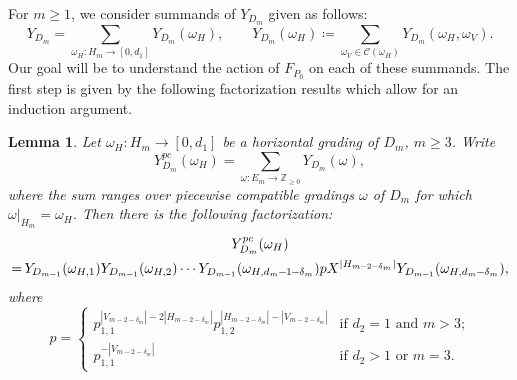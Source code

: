 \documentclass[10pt]{amsart}
\newtheorem{lemma}[theorem]{Lemma}
\theoremstyle{definition}
\newcommand{\cC}{\mathcal{C}}
\newcommand{\ZZ}{\mathbb{Z}}
\newcommand*{\mk}{\mkern -1mu}
\newcommand*{\Mk}{\mkern -2mu}
\begin{document}
For $m\ge1$, we consider summands of $Y_{D_m}$ given as follows:
\begin{equation}
 \label{eq:Y decomposition}
 Y_{D_m}=\sum_{\omega_H:H_m\to[0,d_1]}Y_{D_m}(\omega_H),\qquad Y_{D_m}(\omega_H)\coloneqq \sum_{\omega_V\in\cC(\omega_H)}Y_{D_m}(\omega_H,\omega_V).
\end{equation}
Our goal will be to understand the action of $F_{P_0}$ on each of these summands.
The first step is given by the following factorization results which allow for an induction argument.
\begin{lemma}
 \label{le:piecewise compatible factorization 1}
 Let $\omega_H:H_m\to[0,d_1]$ be a horizontal grading of $D_m$, $m\ge3$.
 Write 
 \[Y_{D_m}^{pc}(\omega_H)=\sum\limits_{\omega:E_m\to\ZZ_{\ge0}}Y_{D_m}(\omega),\]
 where the sum ranges over piecewise compatible gradings $\omega$ of $D_m$ for which $\omega|_{H_m}=\omega_H$.
 Then there is the following factorization:
 \begin{multline}
 \label{eq:piecewise compatible factorization 1}
 Y_{D_m}^{pc}(\omega_H)\\
 =\Mk Y_{\mk D_{m\mk -\mk 1}}(\omega_{H,1})Y_{D_{m\mk -\mk 1}}(\omega_{H,2})\cdots Y_{D_{m\mk -\mk 1}}(\omega_{H,d_m\mk -\mk 1\mk -\mk \delta_m})pX^{|H_{m\mk -\mk 2\mk -\mk \delta_m}|} Y_{D_{m\mk -\mk 1}}(\omega_{H,d_m\mk -\mk \delta_m}),
 \end{multline}
 where 
 \[p=\begin{cases} p_{1,1}^{|V_{m-2-\delta_m}|-2|H_{m-2-\delta_m}|}p_{1,2}^{|H_{m-2-\delta_m}|-|V_{m-2-\delta_m}|} & \text{if $d_2=1$ and $m>3$;}\\ p_{1,1}^{-|V_{m-2-\delta_m}|} & \text{if $d_2>1$ or $m=3$.}\end{cases}\]
\end{lemma}
\end{document}
